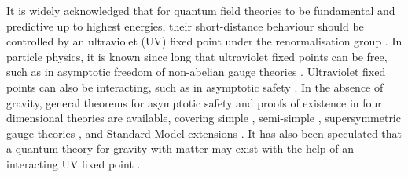 \documentclass[notitlepage,eqsecnum,bm,amsmath,preprintnumbers,superscriptaddress,nofootinbib,aps,11pt]{revtex4-1}
\begin{document}
It is widely acknowledged that for quantum field theories to be fundamental and predictive up to highest energies, their short-distance behaviour should be controlled by an ultraviolet (UV)  fixed point under the renormalisation group  \cite{Wilson:1971bg,Wilson:1971dh}. In particle physics, it is known since long that ultraviolet fixed points can be free, such as in asymptotic freedom of non-abelian gauge theories 
\cite{Gross:1973id,Politzer:1973fx}. Ultraviolet fixed points can also be interacting, such as in asymptotic safety \cite{Weinberg:1980gg}. 
In the absence of gravity, general theorems for asymptotic safety \cite{Bond:2016dvk} and  proofs of existence in four dimensional theories  are available, covering simple \cite{Litim:2014uca,Bond:2017tbw}, semi-simple  \cite{Bond:2017lnq}, supersymmetric gauge theories \cite{Bond:2017suy}, and Standard Model extensions \cite{Bond:2017wut}. 
It has also been speculated that a quantum theory for gravity with matter may exist with the help of an interacting UV fixed point \cite{Niedermaier:2006ns,Litim:2006dx,Niedermaier:2006wt,Percacci:2007sz,Litim:2008tt,Litim:2011cp,
Reuter:2012id}. 
\end{document}
